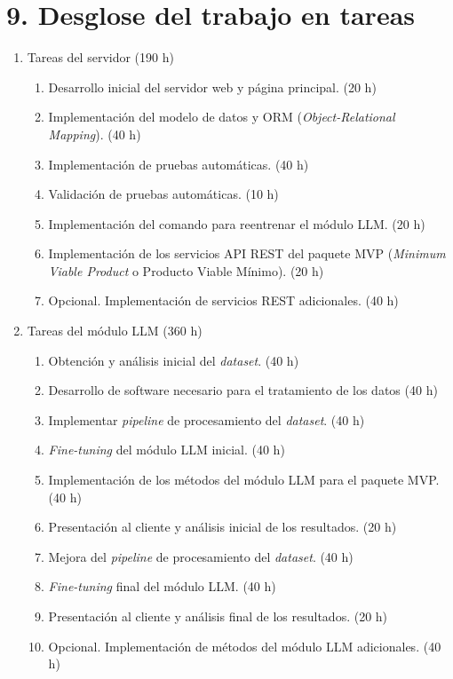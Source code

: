 \documentclass[
11pt, %
]{Clases/charter}
\begin{document}
\section{9. Desglose del trabajo en tareas}
\label{sec:wbs}
\begin{enumerate}
	\item Tareas del servidor (190 h)
	      \begin{enumerate}
		      \item Desarrollo inicial del servidor web y página principal. (20 h)
		      \item Implementación del modelo de datos y ORM (\textit{Object-Relational Mapping}). (40 h)
		      \item Implementación de pruebas automáticas. (40 h)
		      \item Validación de pruebas automáticas. (10 h)
		      \item Implementación del comando para reentrenar el módulo LLM. (20 h)
		      \item Implementación de los servicios API REST del paquete MVP (\textit{Minimum Viable Product} o Producto Viable Mínimo). (20 h)
		      \item Opcional. Implementación de servicios REST adicionales. (40 h)
	      \end{enumerate}
	\item Tareas del módulo LLM (360 h)
	      \begin{enumerate}
		      \item Obtención y análisis inicial del \textit{dataset}. (40 h)
		      \item Desarrollo de software necesario para el tratamiento de los datos (40 h)
		      \item Implementar \textit{pipeline} de procesamiento del \textit{dataset}. (40 h)
		      \item \textit{Fine-tuning} del módulo LLM inicial. (40 h)
		      \item Implementación de los métodos del módulo LLM para el paquete MVP. (40 h)
		      \item Presentación al cliente y análisis inicial de los resultados. (20 h)
		      \item Mejora del \textit{pipeline} de procesamiento del \textit{dataset}. (40 h)
		      \item \textit{Fine-tuning} final del módulo LLM. (40 h)
		      \item Presentación al cliente y análisis final de los resultados. (20 h)
		      \item Opcional. Implementación de métodos del módulo LLM adicionales. (40 h)

\end{enumerate}
\end{enumerate}
\end{document}
